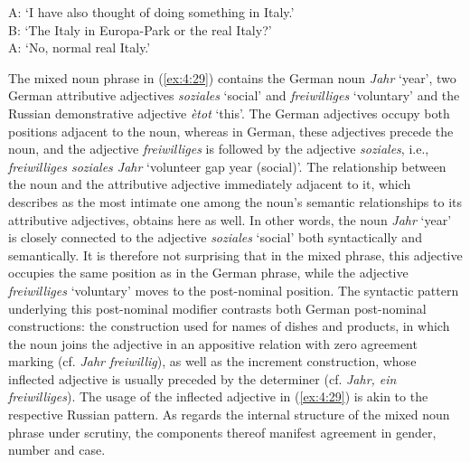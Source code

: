 A: `I have also thought of doing something in Italy.'\\
B: `The Italy in Europa-Park or the  real Italy?'\\
A: `No, normal real Italy.'
\z

\noindent The mixed noun phrase in (\ref{ex:4:29}) contains the German noun \textit{Jahr} `year', two German attributive adjectives \textit{soziales} `social' and \textit{freiwilliges} `voluntary' and the Russian demonstrative adjective \textit{ètot} `this'. The German adjectives occupy both positions adjacent to the noun, whereas in German, these adjectives precede the noun, and the adjective \textit{freiwilliges} is followed by the adjective \textit{soziales}, i.e., \textit{freiwilliges soziales Jahr} `volunteer gap year (social)'. The relationship between the noun and the attributive adjective immediately adjacent to it, which \citet{seiler1976} describes as the most intimate one among the noun's semantic relationships to its attributive adjectives, obtains here as well. In other words, the noun \textit{Jahr} `year' is closely connected to the adjective \textit{soziales} `social' both syntactically and semantically. It is therefore not surprising that in the mixed phrase, this adjective occupies the same position as in the German phrase, while the adjective \textit{freiwilliges} `voluntary' moves to the post-nominal position. The syntactic pattern underlying this post-nominal modifier contrasts both German post-nominal constructions: the construction used for names of dishes and products, in which the noun joins the adjective in an appositive relation with zero agreement marking (cf. \textit{Jahr freiwillig}), as well as the increment construction, whose inflected adjective is usually preceded by the determiner (cf. \textit{Jahr, ein freiwilliges}). The usage of the inflected adjective in (\ref{ex:4:29}) is akin to the respective Russian pattern. As regards the internal structure of the mixed noun phrase under scrutiny, the components thereof manifest agreement in gender, number and case. 

